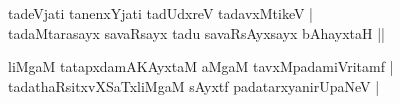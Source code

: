 \begin{entry}
\end{entry}


\begin{entry}
\smallskip
\begin{shl}
tadeVjati tanenxYjati tadUdxreV tadavxMtikeV |\\[1pt]
tadaMtarasayx savaRsayx tadu savaRsAyxsayx bAhayxtaH ||
\end{shl}
\medskip
{}
\smallskip
\begin{shl}
liMgaM tatapxdamAKAyxtaM aMgaM tavxMpadamiVritamf |\\[1pt]
tadathaRsitxvXSaTxliMgaM sAyxtf padatarxyanirUpaNeV |
\end{shl}
\medskip
{}
\end{entry}

